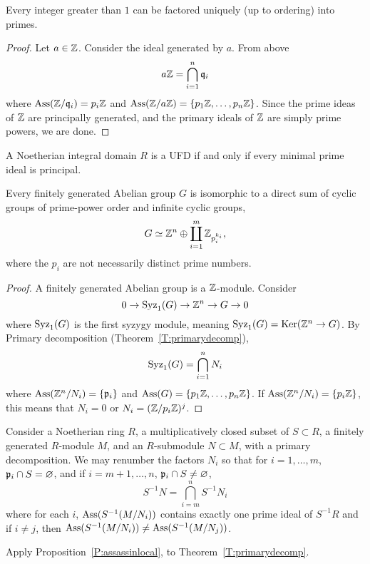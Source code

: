 \documentclass{ximera}
\begin{document}
\begin{theorem}
  Every integer greater than $1$ can be factored uniquely (up to
  ordering) into primes.
  \begin{proof}
    Let $a\in\mathbb Z$. Consider the ideal generated by $a$. From above
    \[
    a\mathbb Z = \bigcap_{i=1}^n \mathfrak{q}_i
    \]
    where $\operatorname{Ass}(\mathbb Z/\mathfrak{q}_i) = p_i\mathbb Z$ and $\operatorname{Ass}(\mathbb Z/a\mathbb Z) = \{p_1\mathbb Z,\dots,
    p_n\mathbb Z\}$. Since the prime ideas of $\mathbb Z$ are principally generated,
    and the primary ideals of $\mathbb Z$ are simply prime powers, we are
    done.
  \end{proof}
\end{theorem}

\begin{exercise}%
   A Noetherian integral domain $R$ is a UFD if and only if every minimal
   prime ideal is principal.
\end{exercise}

\begin{theorem}
  Every finitely generated Abelian group $G$ is isomorphic to a
  direct sum of cyclic groups of prime-power order and infinite cyclic
  groups,
  \[
  G \simeq \mathbb Z^n \oplus \coprod_{i=1}^{m} \mathbb Z_{p_i^{k_i}},
  \]
  where the $p_i$ are not necessarily distinct prime numbers.
  \begin{proof}
    A finitely generated Abelian group is a $\mathbb Z$-module. Consider
    \[
    0 \to \operatorname{Syz}_1(G) \to \mathbb Z^n \to G \to 0 
    \]
    where $\operatorname{Syz}_1(G)$ is the first syzygy module, meaning $\operatorname{Syz}_1(G) =
    \mathop{\mathrm{Ker}}\nolimits(\mathbb Z^n \to G)$. By Primary decomposition (Theorem~\ref{T:primarydecomp}),
    \[
    \operatorname{Syz}_1(G) = \bigcap_{i=1}^n N_i
    \]
    where $\operatorname{Ass}(\mathbb Z^n/N_i) = \{\mathfrak{p}_i\}$ and $\operatorname{Ass}(G) =
    \{p_1\mathbb Z,\dots,p_n\mathbb Z\}$. If $\operatorname{Ass}(\mathbb Z^n/N_i) = \{p_i\mathbb Z\}$, this
    means that $N_i = 0$ or $N_i = (\mathbb Z/p_i\mathbb Z)^j$.
  \end{proof}
\end{theorem}


\begin{theorem}
  Consider a Noetherian ring $R$, a multiplicatively closed subset of
  $S\subset R$, a finitely generated $R$-module $M$, and an
  $R$-submodule $N\subset M$, with a primary decomposition. We may
  renumber the factors $N_i$ so that for $i=1,\dots, m$, $\mathfrak{p}_i\cap S
  =\varnothing$, and if $i=m+1,\dots, n$, $\mathfrak{p}_i\cap S \ne\varnothing$,
  \[
  S^{-1}N = \bigcap_{i=m}^n S^{-1}N_i
  \]
  where for each $i$, $\operatorname{Ass}(S^{-1}(M/N_i))$ contains exactly one prime ideal
  of $S^{-1}R$ and if $i\ne j$, then $\operatorname{Ass}(S^{-1}(M/N_i)) \ne \operatorname{Ass}(S^{-1}(M/N_j))$.
  \begin{sketch}
    Apply Proposition~\ref{P:assassinlocal}, to Theorem~\ref{T:primarydecomp}.
  \end{sketch}
\end{theorem}
\end{document}
